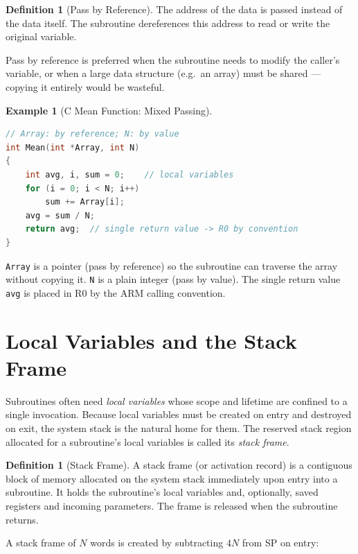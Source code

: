 \documentclass[11pt, a4paper, notitlepage]{report}
\theoremstyle{definition}
\newtheorem{definition}[theorem]{Definition}
\theoremstyle{remark}
\theoremstyle{definition}
\newtheorem{example}[theorem]{Example}
\begin{document}
\begin{definition}[Pass by Reference]
\label{def:pass-by-reference}
The address of the data is passed instead of the data itself. The subroutine dereferences this address to read or write the original variable.
\end{definition}

Pass by reference is preferred when the subroutine needs to modify the caller's variable, or when a large data structure (e.g.\ an array) must be shared --- copying it entirely would be wasteful.

\begin{example}[C Mean Function: Mixed Passing]
\leavevmode
\begin{lstlisting}[language=C]
// Array: by reference; N: by value
int Mean(int *Array, int N)
{
    int avg, i, sum = 0;    // local variables
    for (i = 0; i < N; i++)
        sum += Array[i];
    avg = sum / N;
    return avg;  // single return value -> R0 by convention
}
\end{lstlisting}
\texttt{Array} is a pointer (pass by reference) so the subroutine can traverse the array without copying it. \texttt{N} is a plain integer (pass by value). The single return value \texttt{avg} is placed in R0 by the ARM calling convention.
\end{example}

\section{Local Variables and the Stack Frame}

Subroutines often need \emph{local variables} whose scope and lifetime are confined to a single invocation. Because local variables must be created on entry and destroyed on exit, the system stack is the natural home for them. The reserved stack region allocated for a subroutine's local variables is called its \emph{stack frame}.

\begin{definition}[Stack Frame]
\label{def:stack-frame}
A stack frame (or activation record) is a contiguous block of memory allocated on the system stack immediately upon entry into a subroutine. It holds the subroutine's local variables and, optionally, saved registers and incoming parameters. The frame is released when the subroutine returns.
\end{definition}

A stack frame of $N$ words is created by subtracting $4N$ from SP on entry:
\end{document}
